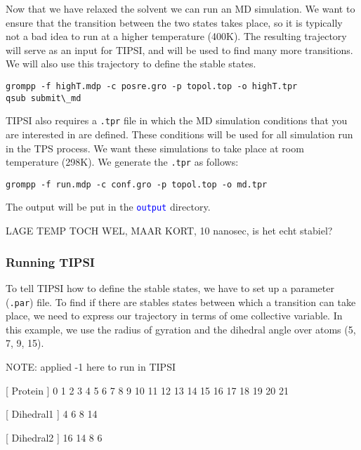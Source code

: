 \documentclass[]{article}
\begin{document}
Now that we have relaxed the solvent we can run an MD simulation. We want to ensure that the transition between the two states takes place, so it is typically not a bad idea to run at a higher temperature (400K). The resulting trajectory will serve as an input for \textsc{TIPSI}, and will be used to find many more transitions. We will also use this trajectory to define the stable states.
%
\begin{lstlisting}
grompp -f highT.mdp -c posre.gro -p topol.top -o highT.tpr
qsub submit\_md
\end{lstlisting}
%
\textsc{TIPSI} also requires a \texttt{.tpr} file in which the MD simulation conditions that you are interested in are defined. These conditions will be used for all simulation run in the TPS process. We want these simulations to take place at room temperature (298K). We generate the \texttt{.tpr} as follows:
%
\begin{lstlisting}
grompp -f run.mdp -c conf.gro -p topol.top -o md.tpr
\end{lstlisting}
%
The output will be put in the \texttt{\textcolor{blue}{output}} directory.

LAGE TEMP TOCH WEL, MAAR KORT, 10 nanosec, is het echt stabiel?

\subsubsection*{Running TIPSI}

To tell \textsc{TIPSI} how to define the stable states, we have to set up a parameter (\texttt{.par}) file. To find if there are stables states between which a transition can take place, we need to express our trajectory in terms of ome collective variable. In this example, we use the radius of gyration and the dihedral angle over atoms (5, 7, 9, 15).

NOTE: applied -1 here to run in TIPSI

[ Protein ]
  0    1    2    3    4    5    6    7    8    9   10   11   12   13   14   15
  16   17   18   19   20   21  

[ Dihedral1 ]
   4    6    8   14

[ Dihedral2 ]
   16   14   8   6
\end{document}
